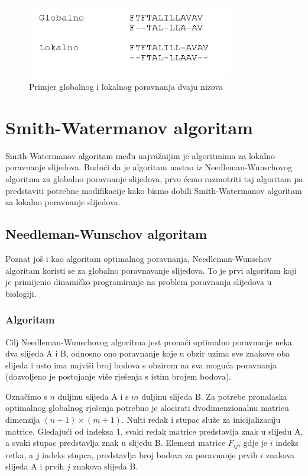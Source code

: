 \documentclass[times, utf8, zavrsni, numeric]{fer}
\begin{document}
\begin{figure}[ht!]
\centering
\includegraphics[width=90mm]{poravnanje.png}
\caption{Primjer globalnog i lokalnog poravnanja dvaju nizova}
\label{poravnanje}
\end{figure}

\chapter{Smith-Watermanov algoritam}
\indent

Smith-Watermanov algoritam\cite{swarticle} među najvažnijim je algoritmima za lokalno poravnanje slijedova. Budući da je algoritam nastao iz Needleman-Wunschovog\cite{nwarticle} algoritma za globalno poravnanje slijedova, prvo ćemo razmotriti taj algoritam pa predstaviti potrebne modifikacije kako bismo dobili Smith-Watermanov algoritam za lokalno poravnanje slijedova.

\section{Needleman-Wunschov algoritam}
\indent

Poznat još i kao algoritam optimalnog poravnanja, Needleman-Wunschov algoritam koristi se za globalno poravnavanje slijedova. To je prvi algoritam koji je primijenio dinamičko programiranje na problem poravnanja slijedova u biologiji.

\subsection{Algoritam}
\indent 

Cilj Needleman-Wunschovog algoritma jest pronaći optimalno poravnanje neka dva slijeda A i B, odnosno ono poravnanje koje u obzir uzima sve znakove oba slijeda i usto ima najviši broj bodova s obzirom na sva moguća poravnanja (dozvoljeno je postojanje više rješenja s istim brojem bodova).

Označimo s $n$ duljinu slijeda A i s $m$ duljinu slijeda B. Za potrebe pronalaska optimalnog globalnog rješenja potrebno je alocirati dvodimenzionalnu matricu dimenzija $(n + 1) \times (m + 1)$. Nulti redak i stupac služe za inicijalizaciju matrice. Gledajući od indeksa 1, svaki redak matrice predstavlja znak u slijedu A, a svaki stupac predstavlja znak u slijedu B. Element matrice $F_{ij}$, gdje je $i$ indeks retka, a $j$ indeks stupca, predstavlja broj bodova za poravnanje prvih $i$ znakova slijeda A i prvih $j$ znakova slijeda B.
\end{document}
